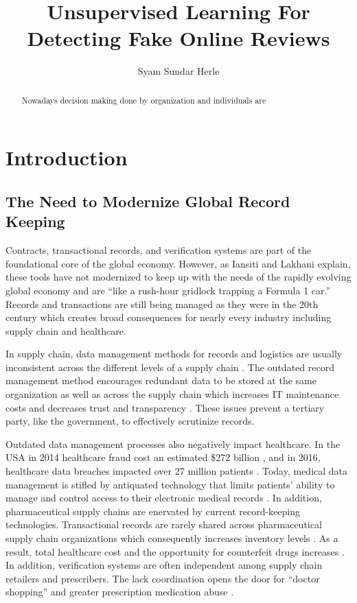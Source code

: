 \documentclass[sigconf]{acmart}
\begin{document}
\title{Unsupervised Learning For Detecting Fake Online Reviews}


\author{Syam Sundar Herle}


\begin{abstract}
Nowadays decision making done by organization and individuals are  
\end{abstract}


\maketitle

\section{Introduction}
\subsection{The Need to Modernize Global Record Keeping}
Contracts, transactional records, and verification systems are part of the foundational core of the global economy. However, as Iansiti and Lakhani \cite{hbr} explain, these tools have not modernized to keep up with the needs of the rapidly evolving global economy and are ``like a rush-hour gridlock trapping a Formula 1 car.'' Records and transactions are still being managed as they were in the 20th century which creates broad consequences for nearly every industry including supply chain and healthcare.

In supply chain, data management methods for records and logistics are usually inconsistent across the different levels of a supply chain \cite{arbc4}. The outdated record management method encourages redundant data to be stored at the same organization as well as across the supply chain which increases IT maintenance costs and decreases trust and transparency \cite{arbc1}. These issues prevent a tertiary party, like the government, to effectively scrutinize records. 

Outdated data management processes also negatively impact healthcare. In the USA in 2014 healthcare fraud cost an estimated \$272 billion \cite{economist2014}, and in 2016, healthcare data breaches impacted over 27 million patients \cite{das2017}. Today, medical data management is stifled by antiquated technology that limits patients' ability to manage and control access to their electronic medical records \cite{ekblaw2016medrec}. 
In addition, pharmaceutical supply chains are enervated by current record-keeping technologies. Transactional records are rarely shared across pharmaceutical supply chain organizations which consequently increases inventory levels \cite{Nematollahi01}. As a result, total healthcare cost and the opportunity for counterfeit drugs increases \cite{Sahay01}. In addition, verification systems are often independent among supply chain retailers and prescribers. The lack coordination opens the door for ``doctor shopping'' and greater prescription medication abuse \cite{hitchingHealthcare}. 
\end{document}
